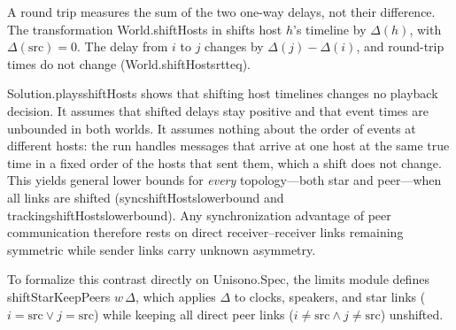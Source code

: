 \documentclass[11pt,a4paper]{article}
\DeclareRobustCommand{\lean}[1]{{\ttfamily\def\_{\textunderscore\allowbreak}#1}}
\theoremstyle{definition}
\begin{document}
A round trip measures the sum of the two one-way delays, not their difference.
The transformation \lean{World.shiftHosts} in  shifts
host $h$'s timeline by $\Delta(h)$, with $\Delta(\mathrm{src}) = 0$. The delay
from $i$ to $j$ changes by $\Delta(j) - \Delta(i)$, and round-trip times do not
change (\lean{World.shiftHosts\_rtt\_eq}).

\lean{Solution.plays\_shiftHosts} shows that shifting host timelines changes no
playback decision. It assumes that shifted delays stay positive and that
event times are unbounded in both worlds. It assumes nothing about the order
of events at different hosts: the run handles messages that arrive at one
host at the same true time in a fixed order of the hosts that sent them,
which a shift does not change. This yields general lower bounds for
\emph{every} topology—both star and peer—when all links are shifted
(\lean{sync\_shiftHosts\_lower\_bound} and
\lean{tracking\_shiftHosts\_lower\_bound}). Any synchronization advantage of
peer communication therefore rests on direct receiver--receiver links remaining
symmetric while sender links carry unknown asymmetry.

To formalize this contrast directly on \lean{Unisono.Spec}, the limits module
 defines \lean{shiftStarKeepPeers} $w\,\Delta$, which
applies $\Delta$ to clocks, speakers, and star links
($i = \mathrm{src} \lor j = \mathrm{src}$) while keeping all direct peer links
($i \ne \mathrm{src} \land j \ne \mathrm{src}$) unshifted.
\end{document}
